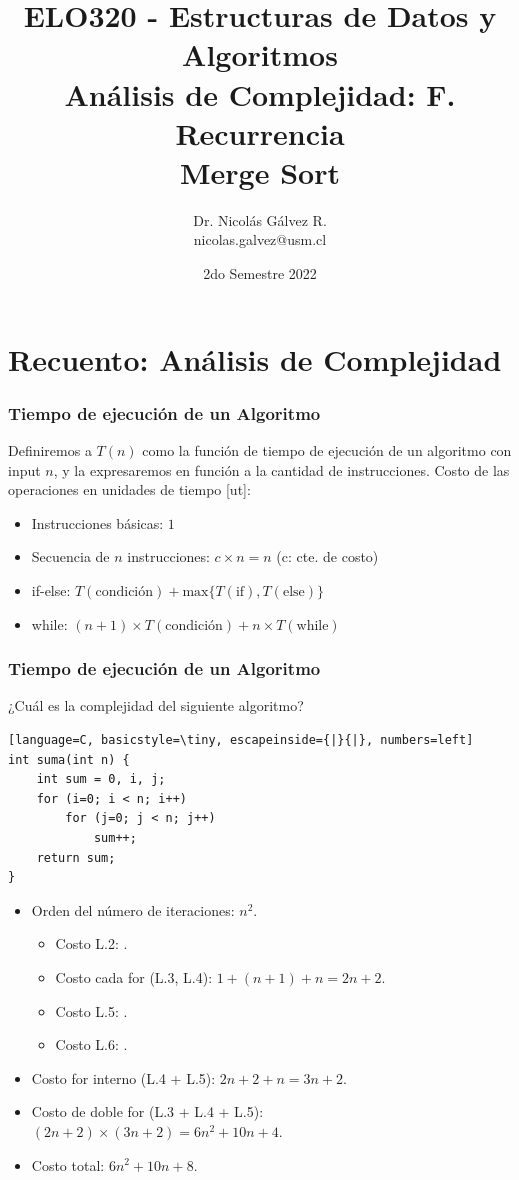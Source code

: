 \documentclass{beamer}
\title{ELO320 - Estructuras de Datos y Algoritmos\\Análisis de Complejidad: F. Recurrencia\\\small{Merge Sort}}
\author{Dr. Nicolás Gálvez R.\\{\small nicolas.galvez@usm.cl}}
\institute{Ing. Civil Telemática - Departamento de Electrónica}
\date{2do Semestre 2022}
\begin{document}
\frame{\titlepage}

%
%

\section{Recuento: Análisis de Complejidad}
\begin{frame}[fragile]
 \frametitle{Tiempo de ejecución de un Algoritmo}
\small Definiremos a $T(n)$ como la función de tiempo de ejecución de un algoritmo con input $n$, y la expresaremos en función a la cantidad de instrucciones.
\bigskip
Costo de las operaciones en unidades de tiempo [ut]:
\begin{itemize}
\item Instrucciones básicas: $1$
\item Secuencia de $n$ instrucciones:  $c \times n = n$ (c: cte. de costo)
\item if-else: $T(\text{condición}) + \text{max}\{T(\text{if}), T(\text{else})\}$
\item while: $(n+1) \times T(\text{condición}) + n \times T(\text{while}) $
\end{itemize}
\end{frame}


\begin{frame}[fragile]
 \frametitle{Tiempo de ejecución de un Algoritmo}
\begin{exampleblock}{¿Cuál es la complejidad del siguiente algoritmo?}
\begin{lstlisting}[language=C, basicstyle=\tiny, escapeinside={|}{|}, numbers=left]
int suma(int n) {
	int sum = 0, i, j;
	for (i=0; i < n; i++) 
		for (j=0; j < n; j++)
			sum++;
	return sum;
}
\end{lstlisting}
\end{exampleblock}
\pause
\begin{itemize}
\item Orden del número de iteraciones: $n^2$. \pause
\begin{itemize}
\item Costo L.2: . \pause 
\item Costo cada for (L.3, L.4): \pause $1+(n+1)+n = 2n+2$. \pause
\item Costo L.5: . \pause
\item Costo L.6: . \pause
\end{itemize}
\item Costo for interno (L.4 + L.5):  \pause $2n+2+n = 3n+2$. \pause
\item Costo de doble for (L.3 + L.4 + L.5): \pause $(2n+2) \times (3n+2) = 6n^2 + 10n + 4$. \pause
\item Costo total: \pause $6n^2 + 10n + 8$. \pause
\end{itemize}

\end{frame}
\end{document}
